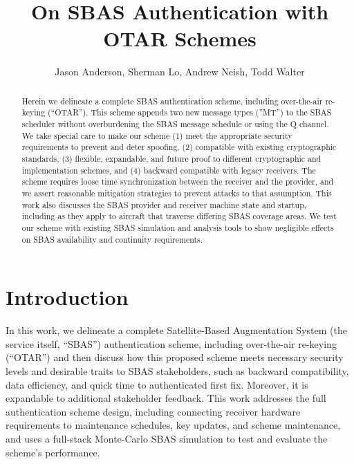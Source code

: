 \documentclass[letterpaper,times]{IONconf/IONconf}
\title{On SBAS Authentication with OTAR Schemes}
\author{Jason Anderson, Sherman Lo, Andrew Neish, Todd Walter}
\begin{document}
\maketitle

\begin{abstract}
Herein we delineate a complete SBAS authentication scheme, including over-the-air re-keying (``OTAR'').
This scheme appends two new message types (''MT'') to the SBAS scheduler without overburdening the SBAS message schedule or using the Q channel.
We take special care to make our scheme (1) meet the appropriate security requirements to prevent and deter spoofing, (2) compatible with existing cryptographic standards, (3) flexible, expandable, and future proof to different cryptographic and implementation schemes, and (4) backward compatible with legacy receivers.
The scheme requires loose time synchronization between the receiver and the provider, and we assert reasonable mitigation strategies to prevent attacks to that assumption.
This work also discusses the SBAS provider and receiver machine state and startup, including as they apply to aircraft that traverse differing SBAS coverage areas.
We test our scheme with existing SBAS simulation and analysis tools to show negligible effects on SBAS availability and continuity requirements.
\end{abstract}

\section{Introduction}

In this work, we delineate a complete Satellite-Based Augmentation System (the service itself, ``SBAS'') authentication scheme, including over-the-air re-keying (``OTAR'') and then discuss how this proposed scheme meets necessary security levels and desirable traits to SBAS stakeholders, such as backward compatibility, data efficiency, and quick time to authenticated first fix.
Moreover, it is expandable to additional stakeholder feedback.
This work addresses the full authentication scheme design, including connecting receiver hardware requirements to maintenance schedules, key updates, and scheme maintenance, and uses a full-stack Monte-Carlo SBAS simulation to test and evaluate the scheme's performance.
\end{document}
